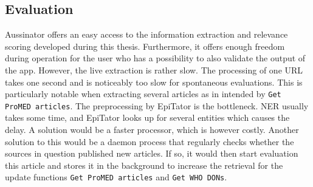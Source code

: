 \subsection{Evaluation}
  Aussinator offers an easy access to the information extraction and relevance scoring developed during this thesis. Furthermore, it offers enough freedom during operation for the user who has a possibility to also validate the output of the app.
  However, the live extraction is rather slow. The processing of one URL takes one second and is noticeably too slow for spontaneous evaluations. This is particularly notable when extracting several articles as in intended by \texttt{Get ProMED articles}.
  The preprocessing by EpiTator is the bottleneck. NER usually takes some time, and EpiTator looks up for several entities which causes the delay.
  A solution would be a faster processor, which is however costly.
  Another solution to this would be a daemon process that regularly checks whether the sources in question published new articles.
  If so, it would then start evaluation this article and stores it in the background to increase the retrieval for the update functions \texttt{Get ProMED articles} and \texttt{Get WHO DONs}.
